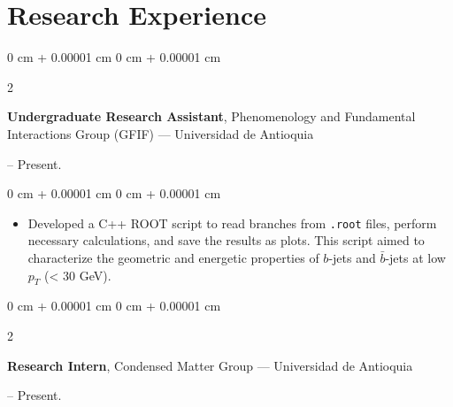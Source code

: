 \documentclass[10pt, letterpaper]{article}
\newenvironment{highlights}{
    \begin{itemize}[
        topsep=0.10 cm,
        parsep=0.10 cm,
        partopsep=0pt,
        itemsep=0pt,
        leftmargin=0 cm + 10pt
    ]
}{
    \end{itemize}
}
\newenvironment{onecolentry}{
    \begin{adjustwidth}{
        0 cm + 0.00001 cm
    }{
        0 cm + 0.00001 cm
    }
}{
    \end{adjustwidth}
}
\newenvironment{twocolentry}[2][]{
    \onecolentry
    \def\secondColumn{#2}
    \setcolumnwidth{\fill, 4.5 cm}
    \begin{paracol}{2}
}{
    \switchcolumn \raggedleft \secondColumn
    \end{paracol}
    \endonecolentry
}
\begin{document}
    \section{Research Experience}
    \begin{twocolentry}{
        2024 – Present.
    }
        \textbf{Undergraduate Research Assistant}, Phenomenology and Fundamental Interactions Group (GFIF) --- Universidad de Antioquia
    \end{twocolentry}

    \vspace{0.10 cm}
    \begin{onecolentry}
        \begin{highlights}
            \item Developed a C++ ROOT script to read branches from \texttt{.root} files, perform necessary calculations, and save the results as plots. This script aimed to characterize the geometric and energetic properties of \(b\)-jets and \(\bar{b}\)-jets at low \(p_T\) (< 30 GeV).
        \end{highlights}
    \end{onecolentry}

    \vspace{0.2 cm}
    \begin{twocolentry}{
        2023 – Present.
    }
        \textbf{Research Intern}, Condensed Matter Group --- Universidad de Antioquia
    \end{twocolentry}
\end{document}
